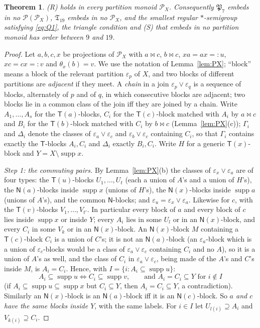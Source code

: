 \documentclass[11pt]{amsart}
\newtheorem{theorem}{Theorem}[section]
\theoremstyle{definition}
\renewcommand{\P}{\mathcal{P}}
\newcommand{\supp}{\operatorname{supp}}
\newcommand{\T}{\mathsf{T}}
\newcommand{\N}{\mathsf{N}}
\begin{document}
\begin{theorem}\label{thm:R}
(R) holds in every partition monoid $\P_X$. Consequently $\mathfrak P_7$ embeds in no $\P(\P_X)$, $\mathfrak T_{19}$ embeds in no $\P_X$, and the smallest regular $*$-semigroup satisfying \eqref{eq:Q1}, the triangle condition and (S) that embeds in no partition monoid has order between $9$ and $19$.
\end{theorem}

\begin{proof}
Let $a,b,c,x$ be projections of $\P_X$ with $a\bowtie c$, $b\bowtie c$, $xa=ax=:u$, $xc=cx=:v$ and $\theta_x(b)=v$. We use the notation of Lemma~\ref{lem:PX}; ``block'' means a block of the relevant partition $\varepsilon_p$ of $X$, and two blocks of different partitions are \emph{adjacent} if they meet. A \emph{chain} in a join $\varepsilon_p\vee\varepsilon_q$ is a sequence of blocks, alternately of $p$ and of $q$, in which consecutive blocks are adjacent; two blocks lie in a common class of the join iff they are joined by a chain. Write $A_1,\dots,A_s$ for the $\T(a)$-blocks, $C_i$ for the $\T(c)$-block matched with $A_i$ by $a\bowtie c$ and $B_i$ for the $\T(b)$-block matched with $C_i$ by $b\bowtie c$ (Lemma~\ref{lem:PX}(c)); $\Gamma_i$ and $\Delta_i$ denote the classes of $\varepsilon_a\vee\varepsilon_c$ and $\varepsilon_b\vee\varepsilon_c$ containing $C_i$, so that $\Gamma_i$ contains exactly the $\T$-blocks $A_i,C_i$ and $\Delta_i$ exactly $B_i,C_i$. Write $H$ for a generic $\T(x)$-block and $Y=X\setminus\supp x$.

\smallskip
\emph{Step 1: the commuting pairs.} By Lemma~\ref{lem:PX}(b) the classes of $\varepsilon_x\vee\varepsilon_a$ are of four types: the $\T(u)$-blocks $U_1,\dots,U_t$ (each a union of $A$'s and a union of $H$'s), the $\N(a)$-blocks inside $\supp x$ (unions of $H$'s), the $\N(x)$-blocks inside $\supp a$ (unions of $A$'s), and the common $\N$-blocks; and $\varepsilon_u=\varepsilon_x\vee\varepsilon_a$. Likewise for $c$, with the $\T(v)$-blocks $V_1,\dots,V_{t'}$. In particular every block of $a$ and every block of $c$ lies inside $\supp x$ or inside $Y$; every $A_i$ lies in some $U_l$ or in an $\N(x)$-block, and every $C_i$ in some $V_k$ or in an $\N(x)$-block. An $\N(x)$-block $M$ containing a $\T(c)$-block $C_i$ is a union of $C$'s; it is not an $\N(a)$-block (an $\varepsilon_a$-block which is a union of $\varepsilon_c$-blocks would be a class of $\varepsilon_a\vee\varepsilon_c$ containing $C_i$ and no $A$), so it is a union of $A$'s as well, and the class of $C_i$ in $\varepsilon_a\vee\varepsilon_c$, being made of the $A$'s and $C$'s inside $M$, is $A_i=C_i$. Hence, with $I=\{i:A_i\subseteq\supp u\}$:
\[
A_i\subseteq\supp u\iff C_i\subseteq\supp v,\qquad\text{and } A_i=C_i\subseteq Y\text{ for } i\notin I
\]
(if $A_i\subseteq\supp u\subseteq\supp x$ but $C_i\subseteq Y$, then $A_i=C_i\subseteq Y$, a contradiction). Similarly an $\N(x)$-block is an $\N(a)$-block iff it is an $\N(c)$-block. So \emph{$a$ and $c$ have the same blocks inside $Y$}, with the same labels. For $i\in I$ let $U_{l(i)}\supseteq A_i$ and $V_{k(i)}\supseteq C_i$.


\end{proof}
\end{document}

